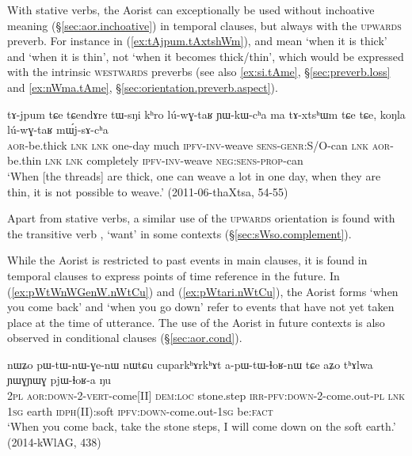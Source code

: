 With stative verbs, the Aorist can exceptionally be used without inchoative meaning (§\ref{sec:aor.inchoative}) in temporal clauses, but always with the \textsc{upwards}  preverb. For instance in (\ref{ex:tAjpum.tAxtshWm}),  and  mean `when it is thick' and `when it is thin', not `when it becomes thick/thin', which would be expressed with the intrinsic \textsc{westwards} preverbs (see also \ref{ex:si.tAme}, §\ref{sec:preverb.loss} and \ref{ex:nWma.tAme}, §\ref{sec:orientation.preverb.aspect}). 

\begin{exe}
\ex \label{ex:tAjpum.tAxtshWm}
 \gll tɤ-jpum tɕe tɕendɤre tɯ-sŋi kʰro lú-wɣ-taʁ ɲɯ-kɯ-cʰa ma tɤ-xtsʰɯm tɕe tɕe, koŋla lú-wɣ-taʁ mɯ́j-sɤ-cʰa   \\
 \textsc{aor}-be.thick \textsc{lnk} \textsc{lnk} one-day much \textsc{ipfv}-\textsc{inv}-weave \textsc{sens}-\textsc{genr}:S/O-can \textsc{lnk} \textsc{aor}-be.thin \textsc{lnk} \textsc{lnk} completely \textsc{ipfv}-\textsc{inv}-weave \textsc{neg}:\textsc{sens}-\textsc{prop}-can \\
\glt `When [the threads] are thick, one can weave a lot in one day, when they are thin, it is not possible to weave.' (2011-06-thaXtsa, 54-55)
\end{exe}

Apart from stative verbs, a similar use of the \textsc{upwards} orientation is found with the transitive verb , `want' in some contexts (§\ref{sec:sWso.complement}).

While the Aorist is restricted to past events in main clauses, it is found in temporal clauses to express points of time reference in the future. In (\ref{ex:pWtWnWGenW.nWtCu}) and (\ref{ex:pWtari.nWtCu}), the Aorist forms   `when you come back' and  `when you go down' refer to events that have not yet taken place at the time of utterance. The use of the Aorist in future contexts is also observed in conditional clauses (§\ref{sec:aor.cond}).

\begin{exe}
\ex \label{ex:pWtWnWGenW.nWtCu}
 \gll nɯʑo pɯ-tɯ-nɯ-ɣe-nɯ nɯtɕu cuparkʰɤrkʰɤt a-pɯ-tɯ-ɬoʁ-nɯ tɕe aʑo tʰɤlwa ɲɯɣɲɯɣ pjɯ-ɬoʁ-a ŋu \\
 \textsc{2pl} \textsc{aor}:\textsc{down}-2-\textsc{vert}-come[II] \textsc{dem}:\textsc{loc} stone.step \textsc{irr}-\textsc{pfv}:\textsc{down}-2-come.out-\textsc{pl} \textsc{lnk} \textsc{1sg} earth \textsc{idph}(II):soft \textsc{ipfv}:\textsc{down}-come.out-\textsc{1sg} be:\textsc{fact} \\
\glt `When you come back, take the stone steps, I will come down on the soft earth.' (2014-kWlAG, 438)
\end{exe}

